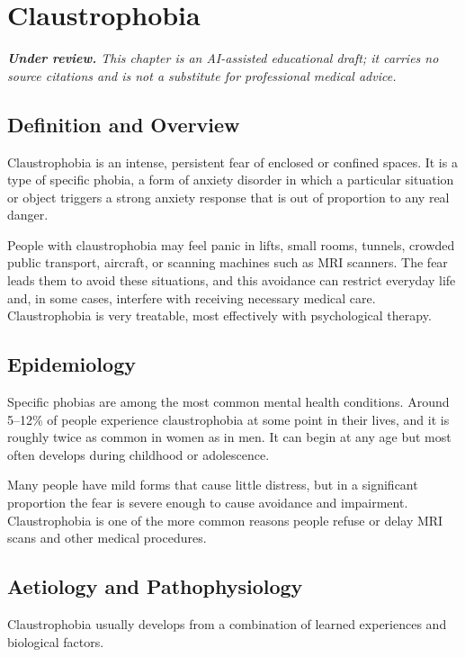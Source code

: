 \chapter{Claustrophobia}

\medskip
\noindent\textit{\textbf{Under review.} This chapter is an AI-assisted educational draft; it carries no source citations and is not a substitute for professional medical advice.}

\section*{Definition and Overview}
Claustrophobia is an intense, persistent fear of enclosed or confined spaces. It is a type of specific phobia, a form of anxiety disorder in which a particular situation or object triggers a strong anxiety response that is out of proportion to any real danger.

People with claustrophobia may feel panic in lifts, small rooms, tunnels, crowded public transport, aircraft, or scanning machines such as MRI scanners. The fear leads them to avoid these situations, and this avoidance can restrict everyday life and, in some cases, interfere with receiving necessary medical care. Claustrophobia is very treatable, most effectively with psychological therapy.

\section*{Epidemiology}
Specific phobias are among the most common mental health conditions. Around 5--12\% of people experience claustrophobia at some point in their lives, and it is roughly twice as common in women as in men. It can begin at any age but most often develops during childhood or adolescence.

Many people have mild forms that cause little distress, but in a significant proportion the fear is severe enough to cause avoidance and impairment. Claustrophobia is one of the more common reasons people refuse or delay MRI scans and other medical procedures.

\section*{Aetiology and Pathophysiology}
Claustrophobia usually develops from a combination of learned experiences and biological factors.

